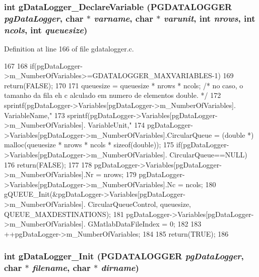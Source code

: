 \subsubsection[{gDataLogger\_\-DeclareVariable}]{\setlength{\rightskip}{0pt plus 5cm}int gDataLogger\_\-DeclareVariable ({\bf PGDATALOGGER} {\em pgDataLogger}, \/  char $\ast$ {\em varname}, \/  char $\ast$ {\em varunit}, \/  int {\em nrows}, \/  int {\em ncols}, \/  int {\em queuesize})}\label{gdatalogger_8h_a3f8f2b3c3f5edc72c3a1887965a544c1}


Definition at line 166 of file gdatalogger.c.


\begin{DoxyCode}
167 {
168         if(pgDataLogger->m_NumberOfVariables>=GDATALOGGER_MAXVARIABLES-1){
169                 return(FALSE);
170         }
171         queuesize = queuesize * nrows * ncols; /* no caso, o tamanho da fila eh c
      alculado em numero de elementos double. */
172         sprintf(pgDataLogger->Variables[pgDataLogger->m_NumberOfVariables].
      VariableName,"%
173         sprintf(pgDataLogger->Variables[pgDataLogger->m_NumberOfVariables].
      VariableUnit,"%
174         pgDataLogger->Variables[pgDataLogger->m_NumberOfVariables].CircularQueue 
      = (double *) malloc(queuesize * nrows * ncols * sizeof(double));
175         if(pgDataLogger->Variables[pgDataLogger->m_NumberOfVariables].
      CircularQueue==NULL){
176                 return(FALSE);
177         }
178         pgDataLogger->Variables[pgDataLogger->m_NumberOfVariables].Nr = nrows;
179         pgDataLogger->Variables[pgDataLogger->m_NumberOfVariables].Nc = ncols;
180         gQUEUE_Init(&pgDataLogger->Variables[pgDataLogger->m_NumberOfVariables].
      CircularQueueControl, queuesize, QUEUE_MAXDESTINATIONS);
181         pgDataLogger->Variables[pgDataLogger->m_NumberOfVariables].
      GMatlabDataFileIndex = 0;
182         
183         ++pgDataLogger->m_NumberOfVariables;
184 
185         return(TRUE);
186 }
\end{DoxyCode}
\subsubsection[{gDataLogger\_\-Init}]{\setlength{\rightskip}{0pt plus 5cm}int gDataLogger\_\-Init ({\bf PGDATALOGGER} {\em pgDataLogger}, \/  char $\ast$ {\em filename}, \/  char $\ast$ {\em dirname})}\label{gdatalogger_8h_ab5eeb22d60836d57bae0dde821337045}


